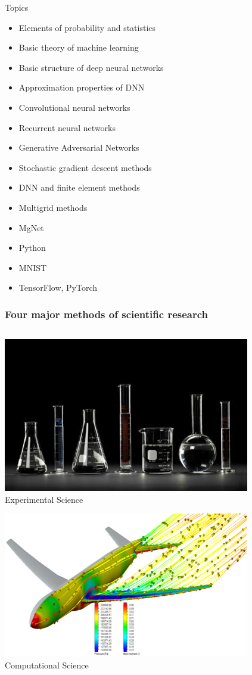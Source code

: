 \documentclass{beamer}
\begin{document}
\begin{CJK*}{UTF8}{gbsn}
\begin{frame}
{Topics}
\begin{itemize}
\item Elements of probability and statistics
\item Basic theory of machine learning
\item Basic structure of deep neural networks
\item Approximation properties of DNN 
\item Convolutional neural networks
\item Recurrent neural networks
\item Generative Adversarial Networks
\item Stochastic gradient descent methods 
\item DNN and finite element methods
\item Multigrid methods
\item MgNet
\item Python
\item MNIST
\item TensorFlow, PyTorch
\end{itemize}
\end{frame}


\begin{frame}
\frametitle{Four major methods of scientific research}
\begin{columns}
	\begin{column}{0.5\textwidth}
		\centering
		\includegraphics[width=0.8\linewidth]{figures/Experimental} \\
		Experimental Science
		\vspace{4mm}
		
		\includegraphics[width=0.8\linewidth]{figures/Computational} \\
		Computational Science
	\end{column}
	

\end{columns}
\end{frame}
\end{CJK*}
\end{document}

